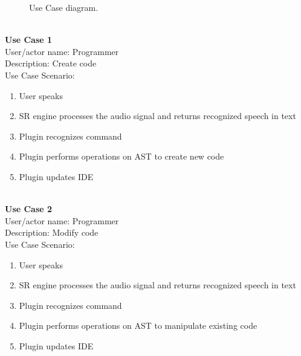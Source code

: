 \begin{figure}[hbt!]
    \centering
    \caption{Use Case diagram.}
    \label{fig:useCases}
\end{figure}
 
\leavevmode \\
\noindent
\textbf{Use Case 1}\\
User/actor name: Programmer\\
Description: Create code\\
Use Case Scenario:
\begin{enumerate}
  \item User speaks
  \item SR engine processes the audio signal and returns recognized speech in text 
  \item Plugin recognizes command
  \item Plugin performs operations on AST to create new code
  \item Plugin updates IDE
\end{enumerate}

\leavevmode \\
\noindent
\textbf{Use Case 2}\\
User/actor name: Programmer\\
Description:  Modify code \\
Use Case Scenario:
\begin{enumerate}
  \item User speaks
  \item SR engine processes the audio signal and returns recognized speech in text 
  \item Plugin recognizes command
  \item Plugin performs operations on AST to manipulate existing code
  \item Plugin updates IDE
\end{enumerate}

